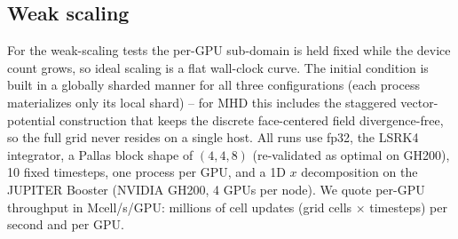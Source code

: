 
\subsection{Weak scaling}
\label{sec:weak_scaling}

For the weak-scaling tests the per-GPU sub-domain is held fixed while the
device count grows, so ideal scaling is a flat wall-clock curve.  The
initial condition is built in a globally sharded manner for all three
configurations (each process materializes only its local shard) -- for MHD
this includes the staggered vector-potential construction that keeps the
discrete face-centered field divergence-free, so the full grid never
resides on a single host.  All runs use fp32, the LSRK4 integrator, a
Pallas block shape of $(4,4,8)$ (re-validated as optimal on GH200), 10
fixed timesteps, one process per GPU, and a 1D $x$ decomposition on the
JUPITER Booster (NVIDIA GH200, 4 GPUs per node).  We quote per-GPU
throughput in Mcell/s/GPU: millions of cell updates (grid cells $\times$
timesteps) per second and per GPU.

